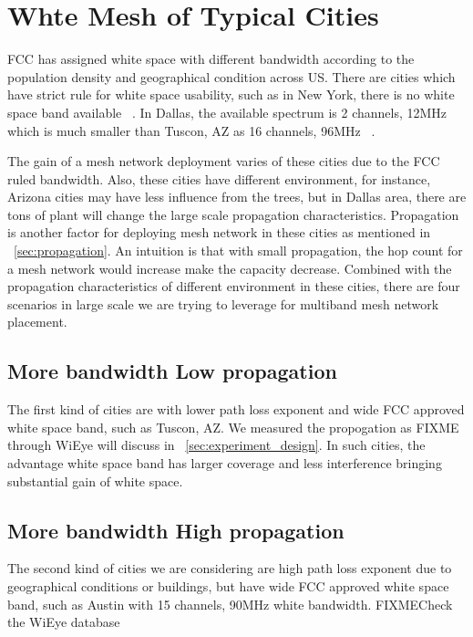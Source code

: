 \section{Whte Mesh of Typical Cities}
\label{sec:cities}


FCC has assigned white space with different bandwidth according to the population density and geographical condition across US.
There are cities which have strict rule for white space usability, such as in New York, there is no white space band available ~\cite{googlespectrumdatabase}. 
In Dallas, the available spectrum is 2 channels, 12MHz which is much smaller than Tuscon, AZ as 16 channels, 96MHz ~\cite{googlespectrumdatabase}. 

The gain of a mesh network deployment varies of these cities due to the FCC ruled bandwidth.
Also, these cities have different environment, for instance, Arizona cities may have less influence from the trees, but in Dallas area, there are tons of plant will change the large scale propagation characteristics.
Propagation is another factor for deploying mesh network in these cities as mentioned in ~\ref{sec:propagation}.
An intuition is that with small propagation, the hop count for a mesh network would increase make the capacity decrease.
Combined with the propagation characteristics of different environment in these cities, there are four scenarios in large scale we are trying to leverage for multiband mesh network placement.

\subsection{More bandwidth Low propagation}
The first kind of cities are with lower path loss exponent and wide FCC approved white space band, such as Tuscon, AZ. We measured the propogation as FIXME through WiEye will discuss in ~\ref{sec:experiment_design}.
In such cities, the advantage white space band has larger coverage and less interference bringing substantial gain of white space.


\subsection{More bandwidth High propagation}
The second kind of cities we are considering are high path loss exponent due to geographical conditions or buildings, but have wide FCC approved white space band, such as Austin with 15 channels, 90MHz white bandwidth. FIXME{Check the WiEye database}

